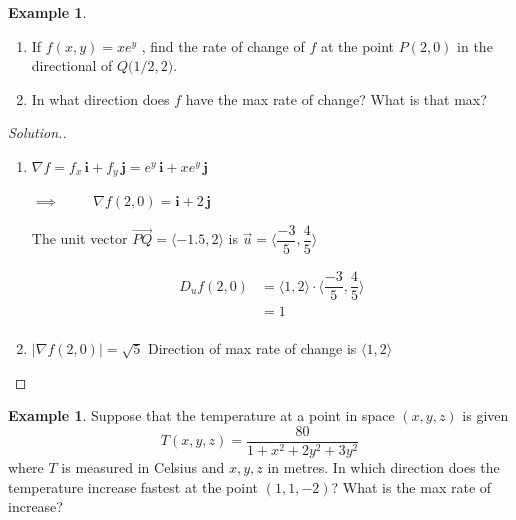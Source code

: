 \documentclass[11pt,a4paper]{article}
\theoremstyle{definition}
\newtheorem{exa}[thm]{Example}
\newenvironment{solution}
  {\renewcommand{\qedsymbol}{}\begin{proof}[\textit{Solution}.]}
  {\end{proof}}
\begin{document}
\begin{exa}
\begin{enumerate}
\item If $f(x,y ) = xe^y$ , find the rate of change of $f$ at the point $P(2,0)$ in the directional of $Q\big(1/2,2\big)$.

\item In what direction does $f$ have the max rate of change? What is that max?
\end{enumerate}
\end{exa}

\begin{solution}
\begin{enumerate}
\item $\displaystyle{\nabla f = f_x\,\textbf{i} + f_y\,\textbf{j} = e^y\,\textbf{i} + xe^y\,\textbf{j}}$

$\implies \hspace{1cm}\displaystyle{\nabla f(2,0) = \textbf{i} + 2\,\textbf{j}}$

The unit vector $\displaystyle{\overrightarrow{PQ} = \langle -1.5,2\rangle}$ is $\displaystyle{\overrightarrow{u} = \bigg\langle \dfrac{-3}{5},\dfrac{4}{5}\bigg\rangle}$

\begin{align*}
D_u f(2,0) & = \langle 1,2\rangle\cdot \bigg\langle \dfrac{-3}{5},\dfrac{4}{5}\bigg\rangle\\
& = 1\\
\end{align*}

\item $\displaystyle{\big|\nabla f(2,0)\big| = \sqrt{5}}$
Direction of max rate of change is $\displaystyle{\langle 1,2\rangle}$
\end{enumerate}
\end{solution}

\begin{exa}


Suppose that the temperature at a point in space $(x,y,z)$ is given $$T(x,y,z) = \frac{80}{1 + x^2 + 2y^2 + 3y^2}$$ where $T$ is measured in Celsius and $x,y,z$ in metres. In which direction does the temperature increase fastest at the point $(1,1,-2)$? What is the max rate of increase?
\end{exa}
\end{document}
